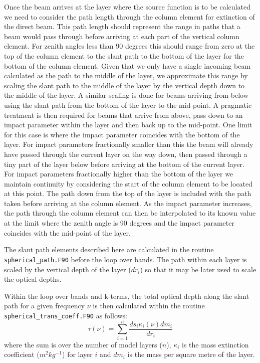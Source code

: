 \noindent
Once the beam arrives at the layer where the source function is to be
calculated we need to consider the path length through the column element
for extinction of the direct beam. This path length should represent the
range in paths that
a beam would pass through before arriving at each part of the vertical column
element. For zenith angles less than 90 degrees this should range from zero at
the top of the column element to the slant path to the bottom of the layer for
the bottom of the column element. Given that we only have a single incoming
beam calculated as the path to the middle of the layer, we approximate this
range by scaling the slant path to the middle of the layer by the vertical
depth down to the middle of the layer. A similar scaling is done for beams
arriving from below using the slant path from the bottom of the layer to the
mid-point. A pragmatic treatment is then required for beams that arrive from
above, pass down to an impact parameter within the layer and then back up to
the mid-point. One limit for this case is where the impact parameter coincides
with the bottom of the layer. For impact parameters fractionally smaller than
this the beam will already have passed through the current layer on the
way down, then passed through a tiny part of the layer below before arriving
at the bottom of the current layer. For impact parameters fractionally higher
than the bottom of the layer we maintain continuity by considering the start
of the column element to be located at this point. The path down from the top
of the layer is included with the path taken before arriving at the column
element. As the impact parameter increases, the path through the column element
can then be interpolated to its known value at the limit where the zenith
angle is 90 degrees and the impact parameter coincides with the mid-point of
the layer.

\noindent
The slant path elements described here are calculated in the routine
{\tt spherical\_path.F90} before the loop over bands. The path within each
layer is scaled by the vertical depth of the layer ($dr_i$) so that it may be
later used to scale the optical depths.

\noindent
Within the loop over bands and k-terms, the total optical depth along the
slant path for a given frequency $\nu$ is then calculated within the
routine {\tt spherical\_trans\_coeff.F90} as follows:
\begin{equation}
\tau(\nu) = \sum_{i=1}^{n} \frac{ds_i \kappa_i(\nu) dm_i}{dr_i}
\end{equation}
\noindent
where the sum is over the number of model layers ($n$), $\kappa_i$
is the mass extinction coefficient ($m^2kg^{-1}$) for layer $i$ and $dm_i$
is the mass per square metre of the layer.

